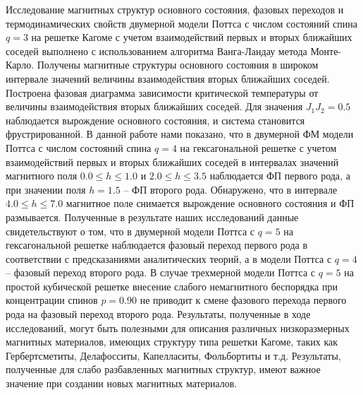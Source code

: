 Исследование магнитных структур основного состояния, фазовых переходов и
термодинамических свойств двумерной модели Поттса с числом состояний спина $q=3$ на решетке
Кагоме с учетом взаимодействий первых и вторых ближайших соседей выполнено с
использованием алгоритма Ванга-Ландау метода Монте-Карло. Получены магнитные структуры
основного состояния в широком интервале значений величины взаимодействия вторых
ближайших соседей. Построена фазовая диаграмма зависимости критической температуры от
величины взаимодействия вторых ближайших соседей. Для значения $J_1J_2=0.5$ наблюдается
вырождение основного состояния, и система становится фрустрированной.
В данной работе нами показано, что в двумерной ФМ модели Поттса с числом состояний
спина $q=4$ на гексагональной решетке с учетом взаимодействий первых и вторых ближайших
соседей в интервалах значений магнитного поля $0.0 \le h \le 1.0$ и $2.0 \le h \le 3.5$ наблюдается ФП
первого рода, а при значении поля $h = 1.5$ -- ФП второго рода. Обнаружено, что в интервале $4.0 \le h
\le 7.0$ магнитное поле снимается вырождение основного состояния и ФП размывается.
Полученные в результате наших исследований данные свидетельствуют о том, что в
двумерной модели Поттса с $q=5$ на гексагональной решетке наблюдается фазовый переход
первого рода в соответствии с предсказаниями аналитических теорий, а в модели Поттса с $q=4$ --
фазовый переход второго рода. В случае трехмерной модели Поттса с $q=5$ на простой кубической
решетке внесение слабого немагнитного беспорядка при концентрации спинов $p=0.90$ не приводит
к смене фазового перехода первого рода на фазовый переход второго рода.
Результаты, полученные в ходе исследований, могут быть полезными для описания
различных низкоразмерных магнитных материалов, имеющих структуру типа решетки Кагоме,
таких как Гербертсметиты, Делафосситы, Капелласиты, Фольбортиты и т.д. Результаты,
полученные для слабо разбавленных магнитных структур, имеют важное значение при создании
новых магнитных материалов. 